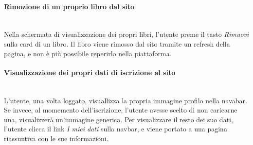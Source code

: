 \paragraph{Rimozione di un proprio libro dal sito}\mbox{}\\
\label{par:RimuoLibro}
Nella schermata di visualizzazione dei propri libri, l'utente preme il tasto \textit{Rimuovi} sulla card di un libro. Il libro viene rimosso dal sito tramite un refresh della pagina, e non è più possibile reperirlo nella piattaforma.

\paragraph{Visualizzazione dei propri dati di iscrizione al sito}\mbox{}\\
\label{par:VisDati}
L'utente, una volta loggato, visuallizza la propria immagine profilo nella navabar. Se invece, al momemento dell'iscrizione, l'utente avesse scelto di non caricarne una, visualizzerà un'immagine generica.
Per visualizzare il resto dei suo dati, l'utente clicca il link \textit{I miei dati} sulla navbar, e viene portato a una pagina riassuntiva con le sue informazioni.







